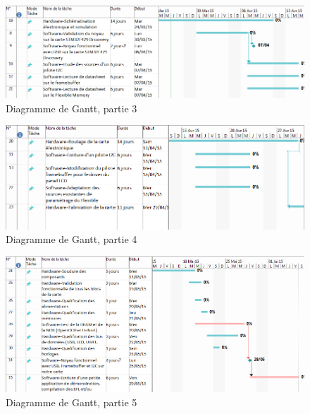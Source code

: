 	    \begin{figure}[H]
			\centering
      		\includegraphics[angle=90,scale=0.7]{Gantt/gantt3.png}
            \caption{Diagramme de Gantt, partie 3}
		\end{figure}

	    \begin{figure}[H]
			\centering
     		\includegraphics[angle=90,scale=0.8]{Gantt/gantt4.png}
            \caption{Diagramme de Gantt, partie 4}
		\end{figure}

	    \begin{figure}[H]
			\centering
            \includegraphics[angle=90,scale=0.6]{Gantt/gantt5.png}
            \caption{Diagramme de Gantt, partie 5}
		\end{figure}
        
        
